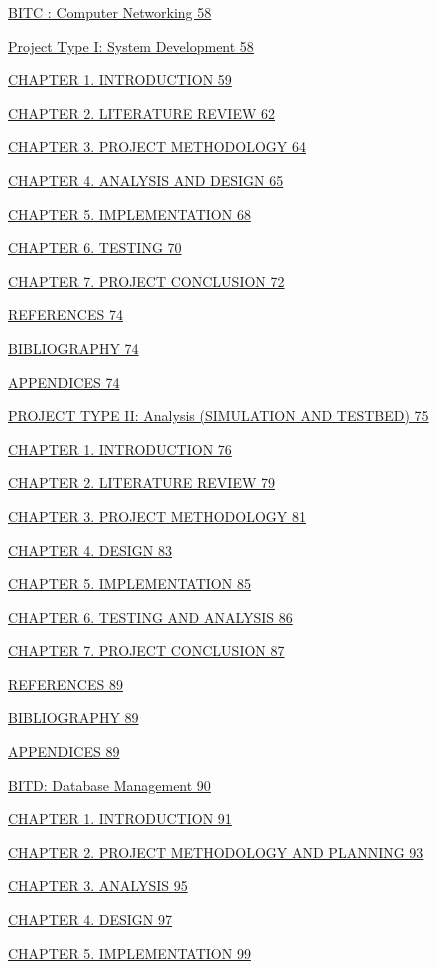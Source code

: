 \documentclass[12pt,a4paper]{article}
\begin{document}
\hyperref[_bookmark12]{BITC : Computer Networking 58}

\hyperref[_bookmark13]{Project Type I: System Development 58}

\hyperref[_bookmark14]{CHAPTER 1. INTRODUCTION 59}

\hyperref[_bookmark15]{CHAPTER 2. LITERATURE REVIEW 62}

\hyperref[_bookmark16]{CHAPTER 3. PROJECT METHODOLOGY 64}

\hyperref[_bookmark17]{CHAPTER 4. ANALYSIS AND DESIGN 65}

\hyperref[_bookmark18]{CHAPTER 5. IMPLEMENTATION 68}

\hyperref[_bookmark19]{CHAPTER 6. TESTING 70}

\hyperref[_bookmark20]{CHAPTER 7. PROJECT CONCLUSION 72}

\hyperref[_bookmark21]{REFERENCES 74}

\hyperref[_bookmark22]{BIBLIOGRAPHY 74}

\hyperref[_bookmark23]{APPENDICES 74}

\hyperref[_bookmark24]{PROJECT TYPE II: Analysis (SIMULATION AND
TESTBED) 75}

\hyperref[_bookmark25]{CHAPTER 1. INTRODUCTION 76}

\hyperref[_bookmark26]{CHAPTER 2. LITERATURE REVIEW 79}

\hyperref[_bookmark27]{CHAPTER 3. PROJECT METHODOLOGY 81}

\hyperref[_bookmark28]{CHAPTER 4. DESIGN 83}

\hyperref[_bookmark29]{CHAPTER 5. IMPLEMENTATION 85}

\hyperref[_bookmark30]{CHAPTER 6. TESTING AND ANALYSIS 86}

\hyperref[_bookmark31]{CHAPTER 7. PROJECT CONCLUSION 87}

\hyperref[_bookmark32]{REFERENCES 89}

\hyperref[_bookmark33]{BIBLIOGRAPHY 89}

\hyperref[_bookmark34]{APPENDICES 89}

\hyperref[_bookmark35]{BITD: Database Management 90}

\hyperref[_bookmark36]{CHAPTER 1. INTRODUCTION 91}

\hyperref[_bookmark37]{CHAPTER 2. PROJECT METHODOLOGY AND PLANNING 93}

\hyperref[_bookmark38]{CHAPTER 3. ANALYSIS 95}

\hyperref[_bookmark39]{CHAPTER 4. DESIGN 97}

\hyperref[_bookmark40]{CHAPTER 5. IMPLEMENTATION 99}
\end{document}
